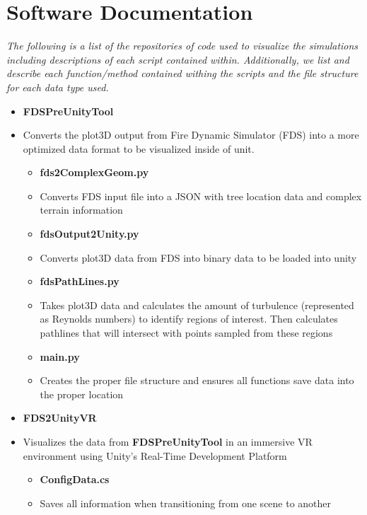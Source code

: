 
\chapter{Software Documentation} %
\centering \textit{The following is a list of the repositories of code used to visualize the simulations including descriptions of each script contained within. Additionally, we list and describe each function/method contained withing the scripts and the file structure for each data type used.} 
\newline
\newline
\label{Appendix-PreUnity} %
\begin{itemize}
\item \textbf{FDSPreUnityTool}
\item[]
Converts the plot3D output from Fire Dynamic Simulator (FDS) into a more optimized data format to be visualized inside of unit. 
   \begin{itemize}
        \item \textbf{fds2ComplexGeom.py}
        \item[] Converts FDS input file into a JSON with tree location data and complex terrain information
        \item \textbf{fdsOutput2Unity.py}
        \item[] Converts plot3D data from FDS into binary data to be loaded into unity
        \item \textbf{fdsPathLines.py}
        \item[] Takes plot3D data and calculates the amount of turbulence (represented as Reynolds numbers) to identify regions of interest. Then calculates pathlines that will intersect with points sampled from these regions
        \item \textbf{main.py}
        \item[] Creates the proper file structure and ensures all functions save data into the proper location  
   \end{itemize}
\pagebreak

\item \textbf{FDS2UnityVR}
\item[] Visualizes the data from \textbf{FDSPreUnityTool} in an immersive VR environment using Unity's Real-Time Development Platform    
   \begin{itemize}
        \item \textbf{ConfigData.cs}
        \item[] Saves all information when transitioning from one scene to another 


\end{itemize}
\end{itemize}
